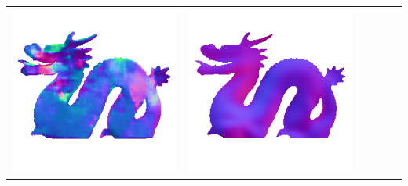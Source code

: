 \begin{tabularx}{\linewidth}{@{}Y@{}Y@{}Y@{}Y@{}Y@{}Y@{}}
\includegraphics[width=\linewidth]{semisynthetic/20150514_21_marrnet_out.png} &
\includegraphics[width=\linewidth]{semisynthetic/20150514_21_ef_out.png} \\

\end{tabularx}
